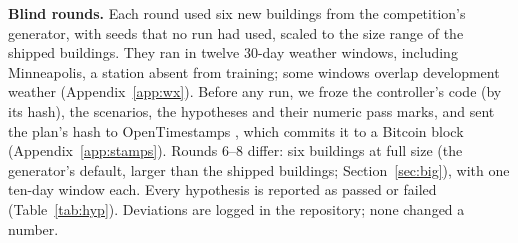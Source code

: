 \documentclass{article}
\begin{document}
\textbf{Blind rounds.} Each round used six new buildings from the competition's generator, with seeds that no run had
used, scaled to the size range of the shipped buildings. They ran in twelve 30-day weather windows, including
Minneapolis, a station absent from training; some windows overlap development weather (Appendix~\ref{app:wx}). Before
any run, we froze the controller's code (by its
hash), the scenarios, the hypotheses and their numeric pass marks, and sent the plan's hash to OpenTimestamps
\cite{todd2016opentimestamps}, which commits it to a Bitcoin block (Appendix~\ref{app:stamps}). Rounds 6--8 differ: six buildings at
full size (the generator's default, larger than the shipped buildings; Section~\ref{sec:big}), with one ten-day window
each. Every hypothesis is reported as passed or failed (Table~\ref{tab:hyp}).
Deviations are logged in the repository; none changed a number.
\end{document}
